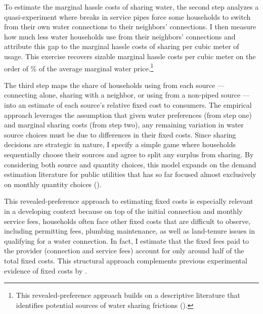 \documentclass[12pt]{article}
\begin{document}
To estimate the marginal hassle costs of sharing water, the second step analyzes a quasi-experiment where breaks in service pipes force some households to switch from their own water connections to their neighbors' connections.  I then measure how much less water households use from their neighbors' connections and attribute this gap to the marginal hassle costs of sharing per cubic meter of usage.  This exercise recovers sizable marginal hassle costs per cubic meter on the order of \unskip\% of the average marginal water price.\footnote{This revealed-preference approach builds on a descriptive literature that identifies potential sources of water sharing frictions (\cite{whittington1992possible,nauges2006water}).}

The third step maps the share of households using from each source --- connecting alone, sharing with a neighbor, or using from a non-piped source --- into an estimate of each source's relative fixed cost to consumers.  The empirical approach leverages the assumption that given water preferences (from step one) and marginal sharing costs (from step two), any remaining variation in water source choices must be due to differences in their fixed costs.  Since sharing decisions are strategic in nature, I specify a simple game where households sequentially choose their sources and agree to split any surplus from sharing.  By considering both source and quantity choices, this model expands on the demand estimation literature for public utilities that has so far focused almost exclusively on monthly quantity choices (\cite{diakite2009proposal,mcrae2014infrastructure,olmstead2009reduced,szabo2015value}).  

This revealed-preference approach to estimating fixed costs is especially relevant in a developing context because on top of the initial connection and monthly service fees, households often face other fixed costs that are difficult to observe, including permitting fees, plumbing maintenance, as well as land-tenure issues in qualifying for a water connection.  In fact, I estimate that the fixed fees paid to the provider (connection and service fees) account for only around half of the total fixed costs.  This structural approach complements previous experimental evidence of fixed costs by \cite{devoto2012happiness}.  


\end{document}
